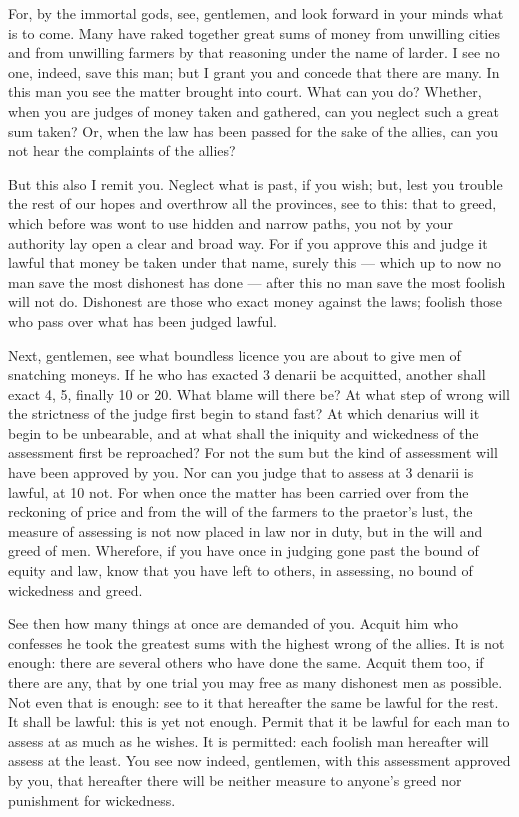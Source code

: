  For, by the immortal gods, see, gentlemen, and look forward in your minds what is to come. Many have raked together great sums of money from unwilling cities and from unwilling farmers by that reasoning under the name of larder. I see no one, indeed, save this man; but I grant you and concede that there are many. In this man you see the matter brought into court. What can you do? Whether, when you are judges of money taken and gathered, can you neglect such a great sum taken? Or, when the law has been passed for the sake of the allies, can you not hear the complaints of the allies?

 But this also I remit you. Neglect what is past, if you wish; but, lest you trouble the rest of our hopes and overthrow all the provinces, see to this: that to greed, which before was wont to use hidden and narrow paths, you not by your authority lay open a clear and broad way. For if you approve this and judge it lawful that money be taken under that name, surely this --- which up to now no man save the most dishonest has done --- after this no man save the most foolish will not do. Dishonest are those who exact money against the laws; foolish those who pass over what has been judged lawful.

 Next, gentlemen, see what boundless licence you are about to give men of snatching moneys. If he who has exacted 3 denarii be acquitted, another shall exact 4, 5, finally 10 or 20. What blame will there be? At what step of wrong will the strictness of the judge first begin to stand fast? At which denarius will it begin to be unbearable, and at what shall the iniquity and wickedness of the assessment first be reproached? For not the sum but the kind of assessment will have been approved by you. Nor can you judge that to assess at 3 denarii is lawful, at 10 not. For when once the matter has been carried over from the reckoning of price and from the will of the farmers to the praetor's lust, the measure of assessing is not now placed in law nor in duty, but in the will and greed of men. Wherefore, if you have once in judging gone past the bound of equity and law, know that you have left to others, in assessing, no bound of wickedness and greed.

 See then how many things at once are demanded of you. Acquit him who confesses he took the greatest sums with the highest wrong of the allies. It is not enough: there are several others who have done the same. Acquit them too, if there are any, that by one trial you may free as many dishonest men as possible. Not even that is enough: see to it that hereafter the same be lawful for the rest. It shall be lawful: this is yet not enough. Permit that it be lawful for each man to assess at as much as he wishes. It is permitted: each foolish man hereafter will assess at the least. You see now indeed, gentlemen, with this assessment approved by you, that hereafter there will be neither measure to anyone's greed nor punishment for wickedness.

